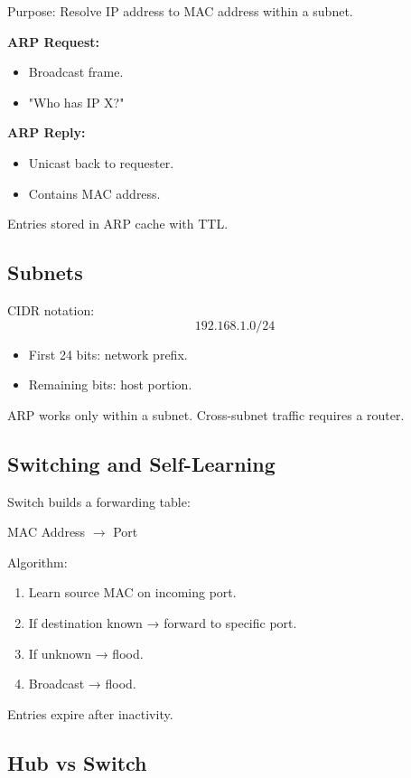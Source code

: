 \documentclass[11pt]{article}
\begin{document}
Purpose: Resolve IP address to MAC address within a subnet.

\textbf{ARP Request:}
\begin{itemize}
    \item Broadcast frame.
    \item "Who has IP X?"
\end{itemize}

\textbf{ARP Reply:}
\begin{itemize}
    \item Unicast back to requester.
    \item Contains MAC address.
\end{itemize}

Entries stored in ARP cache with TTL.

\subsection{Subnets}

CIDR notation:
\[
192.168.1.0/24
\]

\begin{itemize}
    \item First 24 bits: network prefix.
    \item Remaining bits: host portion.
\end{itemize}

ARP works only within a subnet.  
Cross-subnet traffic requires a router.

\subsection{Switching and Self-Learning}

Switch builds a forwarding table:

\begin{center}
MAC Address $\rightarrow$ Port
\end{center}

Algorithm:
\begin{enumerate}
    \item Learn source MAC on incoming port.
    \item If destination known → forward to specific port.
    \item If unknown → flood.
    \item Broadcast → flood.
\end{enumerate}

Entries expire after inactivity.

\subsection{Hub vs Switch}
\end{document}
